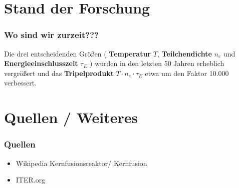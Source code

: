 \documentclass[aspectratio=169]{beamer}
\begin{document}

  \section{Stand der Forschung}

    \begin{frame}
      \frametitle{Wo sind wir zurzeit???}

      Die drei entscheidenden Größen ( \textbf{Temperatur} \( T \), \textbf{Teilchendichte} \( n_e \)
      und \textbf{Energieeinschlusszeit} \( \tau_E \) ) wurden in den letzten 50 Jahren
      erheblich vergrößert und das \textbf{Tripelprodukt} \( T \cdot n_e \cdot \tau_E \)
      etwa um den Faktor 10.000 verbessert.

    \end{frame}

  \section{Quellen / Weiteres}

    \begin{frame}
      \frametitle{Quellen}
      \begin{itemize}
        \item Wikipedia Kernfusionsreaktor/ Kernfusion
        \item ITER.org
      \end{itemize}
    \end{frame}
\end{document}
